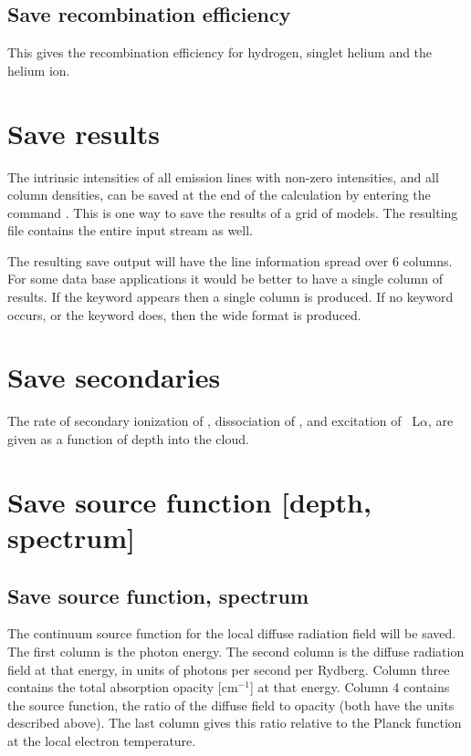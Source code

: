 \subsection{Save recombination efficiency}

This gives the recombination efficiency for hydrogen, singlet helium
and the helium ion.

\section{Save results}

The intrinsic intensities of all emission lines with non-zero
intensities, and all column densities,
can be saved at the end of the calculation by entering the command .
This is one way to save the results of a grid of
models.
The resulting file contains the entire input stream as well.

The resulting save output will have the line information spread over
6 columns.
For some data base applications it would be better to have a
single column of results.
If the keyword  appears then a single column
is produced.
If no keyword occurs, or the keyword  does, then the
wide format is produced.

\section{Save secondaries}

The rate of secondary ionization of \hO, dissociation of \htwo,
and excitation
of \hi\ L$\alpha $, are given as a function of depth into the cloud.

\section{Save source function [depth, spectrum]}

\subsection{Save source function, spectrum}

The continuum source function for the local diffuse radiation field will
be saved.  The first column is the photon energy.  The second column is
the diffuse radiation field at that energy, in units of photons per second
per Rydberg.
Column three contains the total absorption opacity [cm$^{-1}$]
at that energy.
Column 4 contains the source function, the ratio of the
diffuse field to opacity (both have the units described above).
The last
column gives this ratio relative to the Planck function at the local
electron temperature.

